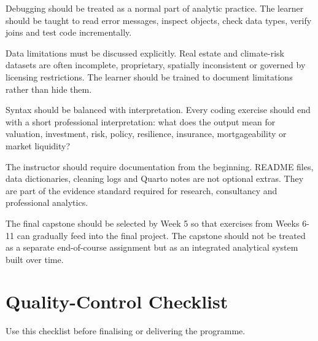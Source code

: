 \documentclass[
  a4paper,
]{article}
\begin{document}
Debugging should be treated as a normal part of analytic practice. The
learner should be taught to read error messages, inspect objects, check
data types, verify joins and test code incrementally.

Data limitations must be discussed explicitly. Real estate and
climate-risk datasets are often incomplete, proprietary, spatially
inconsistent or governed by licensing restrictions. The learner should
be trained to document limitations rather than hide them.

Syntax should be balanced with interpretation. Every coding exercise
should end with a short professional interpretation: what does the
output mean for valuation, investment, risk, policy, resilience,
insurance, mortgageability or market liquidity?

The instructor should require documentation from the beginning. README
files, data dictionaries, cleaning logs and Quarto notes are not
optional extras. They are part of the evidence standard required for
research, consultancy and professional analytics.

The final capstone should be selected by Week 5 so that exercises from
Weeks 6-11 can gradually feed into the final project. The capstone
should not be treated as a separate end-of-course assignment but as an
integrated analytical system built over time.

\section{Quality-Control Checklist}\label{quality-control-checklist}

Use this checklist before finalising or delivering the programme.
\end{document}
